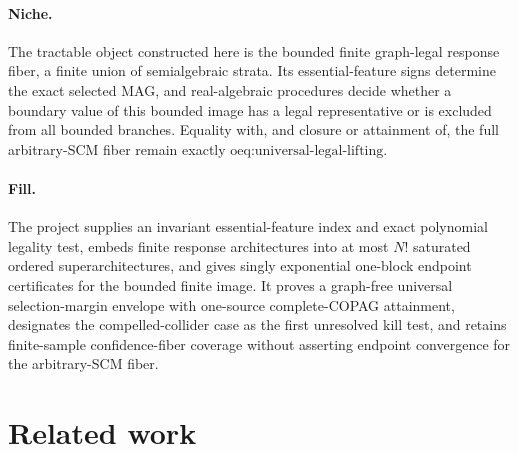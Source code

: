 \documentclass{article}
\begin{document}
\paragraph{Niche.} The tractable object constructed here is the bounded finite graph-legal response fiber, a finite union of semialgebraic strata. Its essential-feature signs determine the exact selected MAG, and real-algebraic procedures decide whether a boundary value of this bounded image has a legal representative or is excluded from all bounded branches. Equality with, and closure or attainment of, the full arbitrary-SCM fiber remain exactly \(\text{oeq:universal-legal-lifting}\).

\paragraph{Fill.} The project supplies an invariant essential-feature index and exact polynomial legality test, embeds finite response architectures into at most \(N!\) saturated ordered superarchitectures, and gives singly exponential one-block endpoint certificates for the bounded finite image.  It proves a graph-free universal selection-margin envelope with one-source complete-COPAG attainment, designates the compelled-collider case as the first unresolved kill test, and retains finite-sample confidence-fiber coverage without asserting endpoint convergence for the arbitrary-SCM fiber.

\section{Related work}
\end{document}
